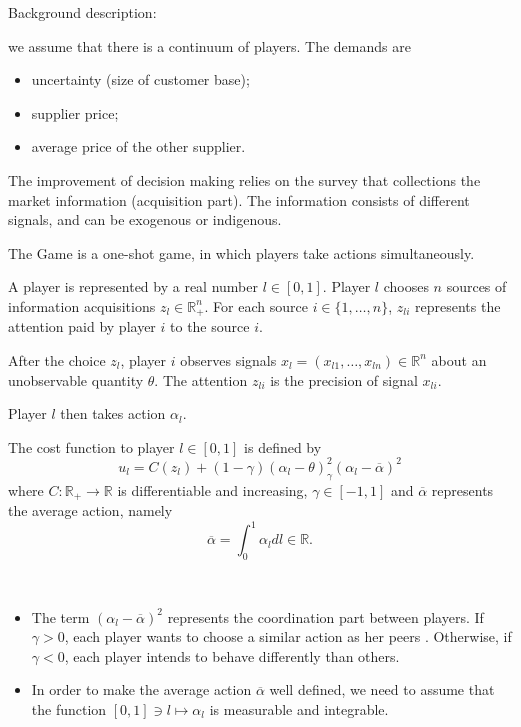 Background description: 

we assume that there is a continuum of players. The demands are
\begin{itemize}
	\item uncertainty (size of customer base);
	\item supplier price;
	\item average price of the other supplier.
\end{itemize}
The improvement of decision making relies on the survey that collections the market information (acquisition part). The information consists of different signals, and can be exogenous or indigenous.

The Game is a one-shot game, in which players take actions simultaneously. 

A player is represented by a real number $l \in [0,1]$. Player $l$ chooses $n$ sources of information acquisitions $z_l \in \mathbb{R}^n_+$. For each source $i\in \{1,\ldots,n\}$, $z_{li}$ represents the attention paid by player $i$ to the source $i$. 

After the choice $z_l$, player $i$ observes signals $x_l =(x_{l1}, \ldots, x_{ln}) \in \mathbb{R}^n$ about an unobservable quantity $\theta$. The attention $z_{li}$ is the precision of signal $x_{li}$.

Player $l$ then takes action $\alpha_l$.

The cost function to player $l \in [0, 1]$ is defined by
$$
u_l = C(z_l) + (1-\gamma) (\alpha_l - \theta)^2 _ \gamma (\alpha_l - \overline{\alpha})^2
$$
where $C: \mathbb{R}_+ \to \mathbb{R}$ is differentiable and increasing, $\gamma \in [-1, 1]$ and $\overline{\alpha}$ represents the average action, namely
$$
	\overline{\alpha} = \int_0^1 \alpha_l dl \in \mathbb{R}.
$$

\begin{remark}\ 
	\begin{itemize}
		\item The term $(\alpha_l - \overline{\alpha})^2$ represents the coordination part between players. If $\gamma >0$, each player wants to choose a similar action as her peers . Otherwise, if $\gamma < 0$, each player intends to behave differently than others.
		\item In order to make the average action $\overline{\alpha}$ well defined, we need to assume that the function $[0,1] \ni l \mapsto \alpha_l$ is measurable and integrable.
	\end{itemize}
\end{remark}

